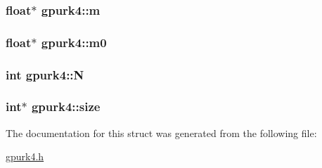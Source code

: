 \label{structgpurk4_a24de106fa1f3355179e63f1930fef06b}
\hypertarget{structgpurk4_a6f8272391b99afdcf25f33c503e1e51e}{
\subsubsection[{m}]{\setlength{\rightskip}{0pt plus 5cm}float$\ast$ {\bf gpurk4::m}}}
\label{structgpurk4_a6f8272391b99afdcf25f33c503e1e51e}
\hypertarget{structgpurk4_af278ba78d8285c823c8d4e1d235289c2}{
\subsubsection[{m0}]{\setlength{\rightskip}{0pt plus 5cm}float$\ast$ {\bf gpurk4::m0}}}
\label{structgpurk4_af278ba78d8285c823c8d4e1d235289c2}
\hypertarget{structgpurk4_a6e2799bb20efd235ac642e0426fa238b}{
\subsubsection[{N}]{\setlength{\rightskip}{0pt plus 5cm}int {\bf gpurk4::N}}}
\label{structgpurk4_a6e2799bb20efd235ac642e0426fa238b}
\hypertarget{structgpurk4_a3dfcc03cdbd85013cfd823100f6af00c}{
\subsubsection[{size}]{\setlength{\rightskip}{0pt plus 5cm}int$\ast$ {\bf gpurk4::size}}}
\label{structgpurk4_a3dfcc03cdbd85013cfd823100f6af00c}


The documentation for this struct was generated from the following file:\begin{DoxyCompactItemize}
\item 
\hyperlink{gpurk4_8h}{gpurk4.h}\end{DoxyCompactItemize}
